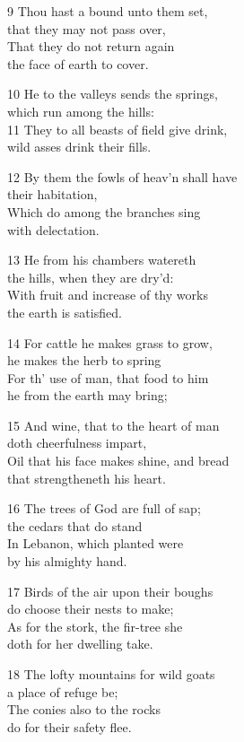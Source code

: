 9 Thou hast a bound unto them set,\\
that they may not pass over,\\
That they do not return again\\
the face of earth to cover.

10 He to the valleys sends the springs,\\
which run among the hills:\\
11 They to all beasts of field give drink,\\
wild asses drink their fills.

12 By them the fowls of heav’n shall have\\
their habitation,\\
Which do among the branches sing\\
with delectation.

13 He from his chambers watereth\\
the hills, when they are dry’d:\\
With fruit and increase of thy works\\
the earth is satisfied.

14 For cattle he makes grass to grow,\\
he makes the herb to spring\\
For th’ use of man, that food to him\\
he from the earth may bring;

15 And wine, that to the heart of man\\
doth cheerfulness impart,\\
Oil that his face makes shine, and bread\\
that strengtheneth his heart.

16 The trees of God are full of sap;\\
the cedars that do stand\\
In Lebanon, which planted were\\
by his almighty hand.

17 Birds of the air upon their boughs\\
do choose their nests to make;\\
As for the stork, the fir-tree she\\
doth for her dwelling take.

18 The lofty mountains for wild goats\\
a place of refuge be;\\
The conies also to the rocks\\
do for their safety flee.

